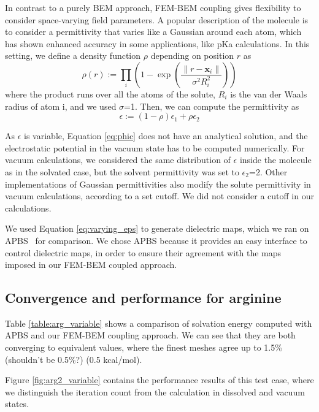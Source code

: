 In contrast to a purely BEM approach, FEM-BEM coupling gives flexibility to consider space-varying field parameters. 
A popular description of the molecule is to consider a permittivity that varies like a Gaussian around each atom,\cite{grant2001smooth} which has shown enhanced accuracy in some applications, like pKa calculations.\cite{li2013dielectric}
In this setting, we define a density function $\rho$ depending on position $r$ as
%
\begin{equation}
\rho(r) := \prod_i \left(1 - \exp{\left(\frac{\|r-\mathbf{x}_i\|}{\sigma^2 R_i^2}\right)}\right)
\end{equation}
%
where the product runs over all the atoms of the solute, $R_i$ is the van der Waals radius of atom i, and we used $\sigma$=1. Then, we can compute the permittivity as
%
\begin{equation}\label{eq:varying_eps}
\epsilon := \left(1-\rho \right) \epsilon_1 + \rho\epsilon_2
\end{equation}

As $\epsilon$ is variable, Equation \eqref{eq:phic} does not have an analytical solution, and the electrostatic potential in the vacuum state has to be computed numerically.
For vacuum calculations, we considered the same distribution of $\epsilon$ inside the molecule as in the solvated case, but the solvent permittivity was set to $\epsilon_2$=2. 
Other implementations of Gaussian permittivities also modify the solute permittivity in vacuum calculations, according to a set cutoff.\cite{li2013dielectric} We did not consider a cutoff in our calculations.


We used Equation \eqref{eq:varying_eps} to generate dielectric maps, which we ran on APBS~\cite{BakerETal2001} for comparison. 
We chose APBS because it provides an easy interface to control dielectric maps, in order to ensure their agreement with the maps imposed in our FEM-BEM coupled approach.

\subsection*{\sffamily \large Convergence and performance for arginine}

Table \ref{table:arg_variable} shows a comparison of solvation energy computed with APBS and our FEM-BEM coupling approach. We can see that they are both converging to equivalent values, where the finest meshes agree up to 1.5\% {\color{red} (shouldn't be 0.5\%?)} (0.5 kcal/mol).

Figure \ref{fig:arg2_variable} contains the performance results of this test case, where we distinguish the iteration count from the calculation in dissolved and vacuum states. 

